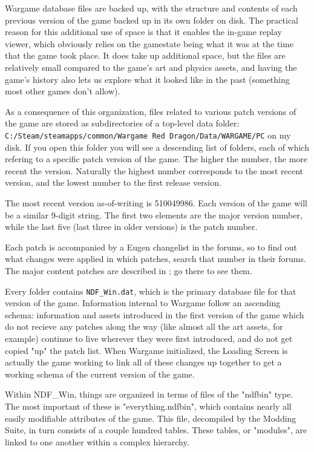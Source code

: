 \documentclass{article}
\begin{document}
Wargame database files are backed up, with the structure and contents of each previous version of the game backed up in its own folder on disk. The practical reason for this additional use of space is that it enables the in-game replay viewer, which obviously relies on the gamestate being what it was at the time that the game took place. It does take up additional space, but the files are relatively small compared to the game's art and physics assets, and having the game's history also lets us explore what it looked like in the past (something most other games don't allow).

As a consequence of this organization, files related to various patch versions of the game are stored as subdirectories of a top-level data folder: \break \texttt{C:/Steam/steamapps/common/Wargame Red Dragon/Data/WARGAME/PC} on my disk. If you open this folder you will see a descending list of folders, each of which refering to a specific patch version of the game. The higher the number, the more recent the version. Naturally the highest number corresponds to the most recent version, and the lowest number to the first release version.

The most recent version as-of-writing is 510049986. Each version of the game will be a similar 9-digit string. The first two elements are the major version number, while the last five (last three in older versions) is the patch number.

Each patch is accompanied by a Eugen changelist in the forums, so to find out what changes were applied in which patches, search that number in their forums. The major content patches are described in ; go there to see them.

Every folder contains \texttt{NDF\_Win.dat}, which is the primary database file for that version of the game. Information internal to Wargame follow an ascending schema: information and assets introduced in the first version of the game which do not recieve any patches along the way (like almost all the art assets, for example) continue to live wherever they were first introduced, and do not get copied "up" the patch list. When Wargame initialized, the Loading Screen is actually the game working to link all of these changes up together to get a working schema of the current version of the game.

Within NDF\_Win, things are organized in terms of files of the "ndfbin" type. The most important of these is "everything.ndfbin", which contains nearly all easily modifiable attributes of the game. This file, decompiled by the Modding Suite, in turn consists of a couple hundred tables. These tables, or "modules", are linked to one another within a complex hierarchy.
\end{document}
